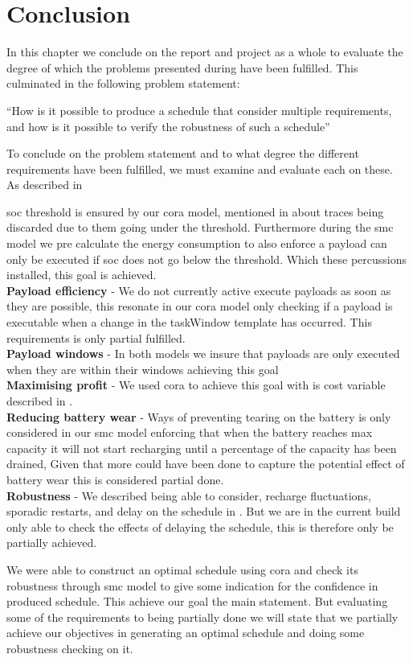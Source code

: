 \chapter{Conclusion} \label{sec:conclusion}
In this chapter we conclude on the report and project as a whole to evaluate the degree of which the problems presented during   have been fulfilled. This culminated in the following problem statement:

\enquote{How is it possible to produce a schedule that consider multiple requirements, and how is it possible to verify the robustness of such a schedule}

To conclude on the problem statement and to what degree the different requirements have been fulfilled, we must examine and evaluate each on these.\\

As described in 

\Gls{soc} threshold is ensured by our \gls{cora} model, mentioned in  about traces being discarded due to them going under the threshold. Furthermore during the \gls{smc} model we pre calculate the energy consumption to also enforce a payload can only be executed if \gls{soc} does not go below the threshold.  Which these percussions installed, this goal is achieved.\\

\textbf{Payload efficiency} - We do not currently active execute payloads as soon as they are possible, this resonate in our \gls{cora} model only checking if a payload is executable when a change in the taskWindow template has occurred. This requirements is only partial fulfilled.\\
\textbf{Payload windows} - In both models we insure that payloads are only executed when they are within their windows achieving this goal \\
\textbf{Maximising profit} - We used \gls{cora} to achieve this goal with is cost variable described in .\\
\textbf{Reducing battery wear} - Ways of preventing tearing on the battery is only considered in our \gls{smc} model enforcing that when the battery reaches max capacity it will not start recharging until a percentage of the capacity has been drained, Given that more could have been done to capture the potential effect of battery wear this is considered partial done. \\
\textbf{Robustness} - We described being able to consider, recharge fluctuations, sporadic restarts, and delay on the schedule in . But we are in the current build only able to check the effects of delaying the schedule, this is therefore only be partially achieved.

We were able to construct an optimal schedule using \gls{cora} and check its robustness through \gls{smc} model to give some indication for the confidence in produced schedule. This achieve our goal the main statement. But evaluating some of the requirements to being partially done we will state that we partially achieve our objectives in generating an optimal schedule and doing some robustness checking on it.